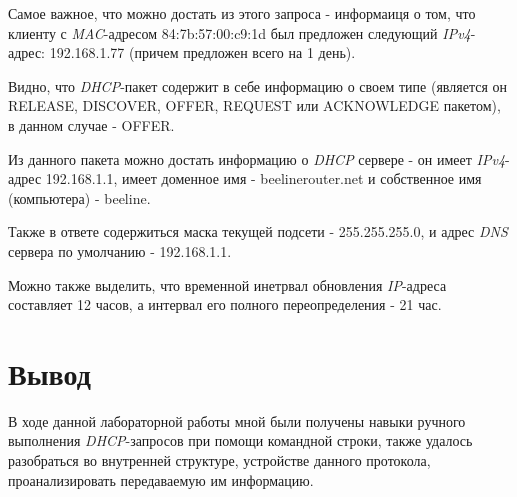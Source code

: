 \documentclass[a4paper]{article}
\begin{document}
  Самое важное, что можно достать из этого запроса - информаиця о том, что клиенту
  с \textit{MAC}-адресом 84:7b:57:00:c9:1d был предложен следующий \textit{IPv4}-адрес:
  192.168.1.77 (причем предложен всего на 1 день).

  Видно, что \textit{DHCP}-пакет содержит в себе информацию о своем типе (является он 
  RELEASE, DISCOVER, OFFER, REQUEST или ACKNOWLEDGE пакетом), в данном случае - OFFER.

  Из данного пакета можно достать информацию о \textit{DHCP} сервере -
  он имеет \textit{IPv4}-адрес 192.168.1.1, имеет доменное имя - beelinerouter.net
  и собственное имя (компьютера) - beeline.

  Также в ответе содержиться маска текущей подсети - 255.255.255.0, и адрес
  \textit{DNS} сервера по умолчанию - 192.168.1.1.

  Можно также выделить, что временной инетрвал обновления \textit{IP}-адреса
  составляет 12 часов, а интервал его полного переопределения - 21 час.

  \section{Вывод}

  В ходе данной лабораторной работы мной были получены навыки ручного выполнения 
  \textit{DHCP}-запросов при помощи командной строки, также удалось разобраться
  во внутренней структуре, устройстве данного протокола, проанализировать
  передаваемую им информацию.
\end{document}
